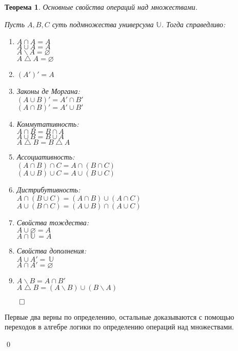 \documentclass[a4paper,12pt,leqno]{article}
\theoremstyle{plain} %
\newtheorem{theorem}{Теорема}
\theoremstyle{definition} %
\renewenvironment{proof}{$\qed$}{{\qed}} %
\begin{document}
\begin{theorem}
	Основные свойства операций над множествами.
	
	Пусть $A,B,C$ суть подмножества универсума  $\mathbb{U}$. Тогда справедливо:
	\begin{enumerate}
		\item $A\cap{}A=A$\\
		$A\cup{}A=A$\\
		$A\backslash{}A=\varnothing$\\
		$A\bigtriangleup{}A=\varnothing$
		\item $(A')'=A$
		\item Законы де Моргана:\\
		\quad  $(A\cup{}B)'=A'\cap{}B'$\\
		\quad $(A\cap{}B)'=A'\cup{}B'$
		\item Коммутативность:\\
		\quad $A\cap{}B=B\cap{}A$\\
		\quad $A\cup{}B=B\cup{}A$\\	
		\quad $A\bigtriangleup{}B=B\bigtriangleup{}A$
		\item Ассоциативность:\\
		\quad $(A\cap{}B)\cap{}C=A\cap{}(B\cap{}C)$\\
		\quad $(A\cup{}B)\cup{}C=A\cup{}(B\cup{}C)$
		\item Дистрибутивность:\\
		\quad $A\cap{}(B\cup{}C)=(A\cap{}B)\cup{}(A\cap{}C)$\\
		\quad $A\cup{}(B\cap{}C)=(A\cup{}B)\cap{}(A\cup{}C)$
		\item Свойства тождества:\\
		\quad $A\cup{}\varnothing=A$\\
		\quad $A\cap{}$$\mathbb{U}$$\,=A$
		\item Свойства дополнения:\\
		\quad $A\cup{}A'=\,$$\mathbb{U}$\\
		\quad $A\cap{}A'=\varnothing$
		\item $A\backslash{}B=A\cap{}B'$\\
		$A\bigtriangleup{}B=(A\backslash{}B)\cup{}(B\backslash{}A)$
	\end{enumerate}
\end{theorem}
\begin{proof}

Первые два верны по определению, остальные доказываются с помощью переходов в алгебре логики по определению операций над множествами.

\end{proof}
\end{document}
